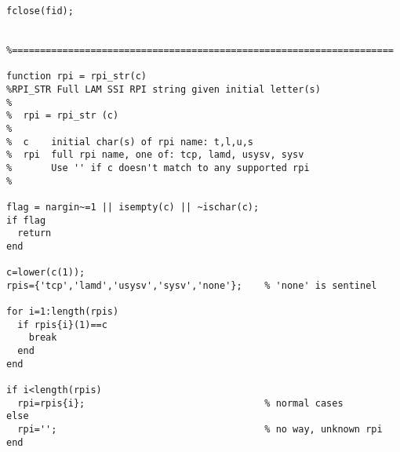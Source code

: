 \begin{lstlisting}[linerange={1-1,16-325}]
fclose(fid);


%====================================================================

function rpi = rpi_str(c)
%RPI_STR Full LAM SSI RPI string given initial letter(s)
%
%  rpi = rpi_str (c)
%
%  c    initial char(s) of rpi name: t,l,u,s
%  rpi  full rpi name, one of: tcp, lamd, usysv, sysv
%       Use '' if c doesn't match to any supported rpi
%
 
flag = nargin~=1 || isempty(c) || ~ischar(c);
if flag
  return
end
                                                                                
c=lower(c(1));
rpis={'tcp','lamd','usysv','sysv','none'};    % 'none' is sentinel

for i=1:length(rpis)
  if rpis{i}(1)==c
    break
  end
end

if i<length(rpis)
  rpi=rpis{i};                                % normal cases
else
  rpi='';                                     % no way, unknown rpi
end
\end{lstlisting}
